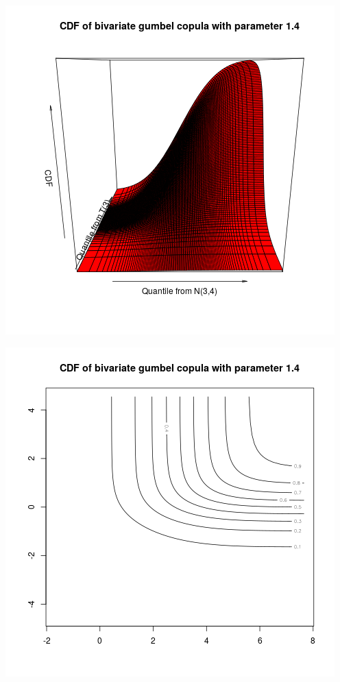 \documentclass{article}
\begin{document}
\includegraphics{"plot_q2_3"}
\pagebreak

\includegraphics{"plot_q2_4"}
\pagebreak
\end{document}
